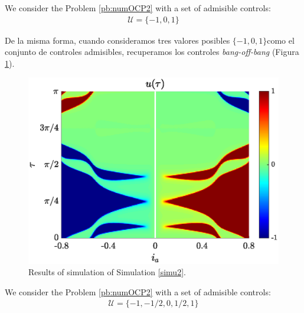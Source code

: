 \vspace{1em}
\begin{simulation}\label{simu2}
    We consider the Problem \ref{pb:numOCP2} with a set of admisible controls:
    \begin{gather}
        \mathcal{U} = \{-1,0,1\}
    \end{gather}
\end{simulation}

De la misma forma, cuando consideramos tres valores posibles $\{-1,0,1\}$como el conjunto de controles admisibles, recuperamos los controles \emph{bang-off-bang} (Figura \ref{fig:sim-bang-off-bang}).

\begin{figure}[ht!]
    \hspace{0.05em}
    \includegraphics[scale=0.525]{img/fig06.eps}
    \caption{Results of simulation of Simulation \ref{simu2}.}
    \label{fig:sim-bang-off-bang}
\end{figure} 

\vspace{1em}
\begin{simulation}\label{simu3}
We consider the Problem \ref{pb:numOCP2} with a set of admisible controls:
\begin{gather}
    \mathcal{U} = \{-1,-1/2,0,1/2,1\}
\end{gather} 
\end{simulation}


